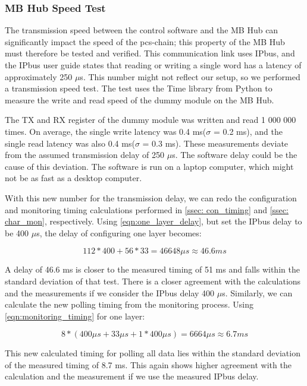 \documentclass[main.tex]{subfiles}
\begin{document}
\subsubsection{MB Hub Speed Test}

The transmission speed between the control software and the MB Hub can significantly impact the speed of the \gls{pcs}-chain; this property of the MB Hub must therefore be tested and verified. This communication link uses IPbus, and the IPbus user guide states that reading or writing a single word has a latency of approximately 250 $\mu$s\cite{ipbus_guide}. This number might not reflect our setup, so we performed a transmission speed test. The test uses the Time library from Python to measure the write and read speed of the dummy module on the MB Hub.

The TX and RX register of the dummy module was written and read 1 000 000 times. On average, the single write latency was 0.4 ms($\sigma$ = 0.2 ms), and the single read latency was also 0.4 ms($\sigma$ = 0.3 ms). These measurements deviate from the assumed transmission delay of 250 $\mu$s. The software delay could be the cause of this deviation. The software is run on a laptop computer, which might not be as fast as a desktop computer.

With this new number for the transmission delay, we can redo the configuration and monitoring timing calculations performed in \autoref{ssec: con_timing} and \autoref{ssec: char_mon}, respectively. Using \autoref{eqn:one_layer_delay}, but set the IPbus delay to be 400 $\mu$s, the delay of configuring one layer becomes:

\begin{equation} \label{eqn:new_one_layer_delay}
112 * 400 + 56*33 =  46648\mu s \approx 46.6 ms
\end{equation}

A delay of 46.6 ms is closer to the measured timing of 51 ms and falls within the standard deviation of that test. There is a closer agreement with the calculations and the measurements if we consider the IPbus delay 400 $\mu$s. Similarly, we can calculate the new polling timing from the monitoring process. Using \autoref{eqn:monitoring_timing} for one layer:

\begin{equation} \label{eqn:new_monitoring_timing}
8*(400\mu s + 33 \mu s + 1*400\mu s) = 6664 \mu s \approx 6.7 ms
\end{equation}

This new calculated timing for polling all data lies within the standard deviation of the measured timing of 8.7 ms. This again shows higher agreement with the calculation and the measurement if we use the measured IPbus delay.
\end{document}

